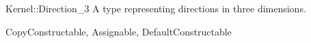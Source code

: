 \begin{ccRefConcept}{Kernel::Direction_3}
A type representing directions in three dimensions.

\ccRefines
CopyConstructable, Assignable, DefaultConstructable

\ccSeeAlso
{} \\
 \\
  \\
 \\

\end{ccRefConcept}

